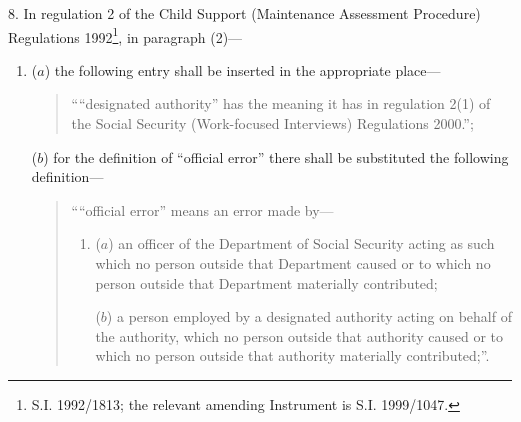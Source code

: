 \documentclass[12pt,a4paper]{article}
\begin{document}
\medskip

8.  In regulation 2 of the Child Support (Maintenance Assessment Procedure) Regulations 1992\footnote{\frenchspacing S.I. 1992/1813; the relevant amending Instrument is S.I. 1999/1047.}, in paragraph (2)—
\begin{enumerate}\item[]
($a$) the following entry shall be inserted in the appropriate place—
\begin{quotation}
    ““designated authority” has the meaning it has in regulation 2(1) of the Social Security (Work-focused Interviews) Regulations 2000.”; 
\end{quotation}

($b$) for the definition of “official error” there shall be substituted the following definition—
\begin{quotation}
    ““official error” means an error made by—
\begin{enumerate}\item[]
    ($a$) 
    an officer of the Department of Social Security acting as such which no person outside that Department caused or to which no person outside that Department materially contributed;

    ($b$) 
    a person employed by a designated authority acting on behalf of the authority, which no person outside that authority caused or to which no person outside that authority materially contributed;”. 
\end{enumerate}
\end{quotation}
\end{enumerate}

\medskip
\end{document}
